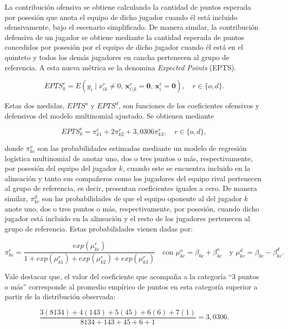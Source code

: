 \documentclass[
  12pt,
]{article}
\begin{document}
La contribución ofensiva se obtiene calculando la cantidad de puntos
esperada por posesión que anota el equipo de dicho jugador cuando él
está incluido ofensivamente, bajo el escenario simplificado. De manera
similar, la contribución defensiva de un jugador se obtiene mediante la
cantidad esperada de puntos concedidos por posesión por el equipo de
dicho jugador cuando él está en el quinteto y todos los demás jugadores
en cancha pertenecen al grupo de referencia. A esta nueva métrica se la
denomina \emph{Expected Points} (EPTS).

\begin{equation}
EPTS_k^r= E(y_i \mid x_{ik}^r \ne 0,\, \boldsymbol{x}_{{i\setminus{k}}}^r = \boldsymbol{0},\, \boldsymbol{x}_i^{\overline{r}} = \boldsymbol{0}), \quad r \in \{o, d\}.
\end{equation}

Estas dos medidas, \(EPTS^o\) y \(EPTS^d\), son funciones de los
coeficientes ofensivos y defensivos del modelo multinomial ajustado. Se
obtienen mediante

\begin{equation}
EPTS_k^r= \pi^r_{k1}+2\pi_{k2}^r+3,0306\pi_{k3}^r, \quad r \in \{o,d\},
\end{equation}

donde \(\pi_{kc}^o\) son las probabilidades estimadas mediante un modelo
de regresión logística multinomial de anotar uno, dos o tres puntos o
más, respectivamente, por posesión del equipo del jugador \(k\), cuando
este se encuentra incluido en la alineación y tanto sus compañeros como
los jugadores del equipo rival pertenecen al grupo de referencia, es
decir, presentan coeficientes iguales a cero. De manera similar,
\(\pi_{kc}^d\) son las probabilidades de que el equipo oponente al del
jugador \(k\) anote uno, dos o tres puntos o más, respectivamente, por
posesión, cuando dicho jugador está incluido en la alineación y el resto
de los jugadores pertenecen al grupo de referencia. Estas probabilidades
vienen dadas por:

\[\pi_{kc}^r=\frac{exp(\mu_{kc}^r)}{1+exp(\mu_{k1}^r)+exp(\mu_{k2}^r)+exp(\mu_{k3}^r)} \quad \text{con } \mu_{kc}^o=\beta_{0c}+\beta_{kc}^o \quad \text{y } \mu_{kc}^d=\beta_{0c}-\beta_{kc}^d.\]

Vale destacar que, el valor del coeficiente que acompaña a la categoría
``3 puntos o más'' corresponde al promedio empírico de puntos en esta
categoría superior a partir de la distribución observada:

\[\frac{3(8134)+4(143)+5(45)+6(6)+7(1)}{8134+143+45+6+1}=3,0306.\]
\end{document}
